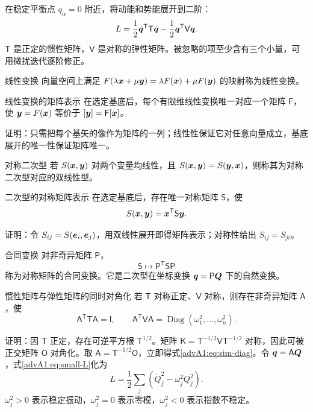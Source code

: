 在稳定平衡点 $q_\alpha=0$ 附近，将动能和势能展开到二阶：
\begin{equation}\label{advA1:eq:small-L}
 L=\frac12\dot{\vect q}^{\mathsf T}\mathsf T\dot{\vect q}
 -\frac12\vect q^{\mathsf T}\mathsf V\vect q .
\end{equation}
$\mathsf T$ 是正定的惯性矩阵，$\mathsf V$ 是对称的弹性矩阵。被忽略的项至少含有三个小量，可用微扰迭代逐阶修正。

\begin{advdefinition}{线性变换}\label{advA1:def:linear-map}
向量空间上满足
$F(\lambda\vect x+\mu\vect y)=\lambda F(\vect x)+\mu F(\vect y)$
的映射称为线性变换。
\end{advdefinition}

\begin{advtheorem}{线性变换的矩阵表示}\label{advA1:thm:linear-matrix}
在选定基底后，每个有限维线性变换唯一对应一个矩阵 $\mathsf F$，使
$\vect y=F(\vect x)$ 等价于 $[\vect y]=\mathsf F[\vect x]$。
\end{advtheorem}
证明：只需把每个基矢的像作为矩阵的一列；线性性保证它对任意向量成立，基底展开的唯一性保证矩阵唯一。

\begin{advdefinition}{对称二次型}\label{advA1:def:quadratic-form}
若 $S(\vect x,\vect y)$ 对两个变量均线性，且
$S(\vect x,\vect y)=S(\vect y,\vect x)$，则称其为对称二次型对应的双线性型。
\end{advdefinition}

\begin{advtheorem}{二次型的对称矩阵表示}\label{advA1:thm:quadratic-matrix}
在选定基底后，存在唯一对称矩阵 $\mathsf S$，使
\[
 S(\vect x,\vect y)=\vect x^{\mathsf T}\mathsf S\vect y.
\]
\end{advtheorem}
证明：令 $S_{ij}=S(\vect e_i,\vect e_j)$，用双线性展开即得矩阵表示；对称性给出 $S_{ij}=S_{ji}$。

\begin{advdefinition}{合同变换}\label{advA1:def:congruence}
对非奇异矩阵 $\mathsf P$，
\[
 \mathsf S\longmapsto \mathsf P^{\mathsf T}\mathsf S\mathsf P
\]
称为对称矩阵的合同变换。它是二次型在坐标变换 $\vect q=\mathsf P\vect Q$ 下的自然变换。
\end{advdefinition}

\begin{advtheorem}{惯性矩阵与弹性矩阵的同时对角化}\label{advA1:thm:normal-modes}
若 $\mathsf T$ 对称正定、$\mathsf V$ 对称，则存在非奇异矩阵 $\mathsf A$，使
\begin{equation}\label{advA1:eq:sim-diag}
 \mathsf A^{\mathsf T}\mathsf T\mathsf A=\mathsf I,
 \qquad
 \mathsf A^{\mathsf T}\mathsf V\mathsf A
 =\operatorname{Diag}(\omega_1^2,\ldots,\omega_n^2).
\end{equation}
\end{advtheorem}
证明：因 $\mathsf T$ 正定，存在可逆平方根 $\mathsf T^{1/2}$。矩阵
$\mathsf K=\mathsf T^{-1/2}\mathsf V\mathsf T^{-1/2}$ 对称，因此可被正交矩阵 $\mathsf O$ 对角化。取
$\mathsf A=\mathsf T^{-1/2}\mathsf O$，立即得式\eqref{advA1:eq:sim-diag}。令 $\vect q=\mathsf A\vect Q$，式\eqref{advA1:eq:small-L}化为
\[
 L=\frac12\sum_j(\dot Q_j^2-\omega_j^2Q_j^2).
\]
$\omega_j^2>0$ 表示稳定振动，$\omega_j^2=0$ 表示零模，$\omega_j^2<0$ 表示指数不稳定。


